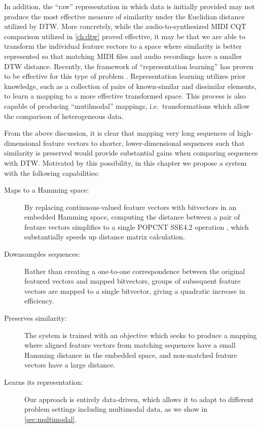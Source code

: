 In addition, the ``raw'' representation in which data is initially provided may not produce the most effective measure of similarity under the Euclidian distance utilized by DTW.
More concretely, while the audio-to-synthesized MIDI CQT comparison utilized in \cref{ch:dtw} proved effective, it may be that we are able to transform the individual feature vectors to a space where similarity is better represented so that matching MIDI files and audio recordings have a smaller DTW distance.
Recently, the framework of ``representation learning'' has proven to be effective for this type of problem \cite{bengio2013representation}.
Representation learning utilizes prior knowledge, such as a collection of pairs of known-similar and dissimilar elements, to learn a mapping to a more effective transformed space.
This process is also capable of producing ``mutilmodal'' mappings, i.e.\ transformations which allow the comparison of heterogeneous data.

From the above discussion, it is clear that mapping very long sequences of high-dimensional feature vectors to shorter, lower-dimensional sequences such that similarity is preserved would provide substantial gains when comparing sequences with DTW.
Motivated by this possibility, in this chapter we propose a system with the following capabilities:
\begin{description}
\item[Maps to a Hamming space:] By replacing continuous-valued feature vectors with bitvectors in an embedded Hamming space, computing the distance between a pair of feature vectors simplifies to a single POPCNT SSE4.2 operation \cite{intel2007programming}, which substantially speeds up distance matrix calculation.
\item[Downsamples sequences:] Rather than creating a one-to-one correspondence between the original featured vectors and mapped bitvectors, groups of subsequent feature vectors are mapped to a single bitvector, giving a quadratic increase in efficiency.
\item[Preserves similarity:] The system is trained with an objective which seeks to produce a mapping where aligned feature vectors from matching sequences have a small Hamming distance in the embedded space, and non-matched feature vectors have a large distance.
\item[Learns its representation:] Our approach is entirely data-driven, which allows it to adapt to different problem settings including multimodal data, as we show in \cref{sec:multimodal}.
\end{description}

